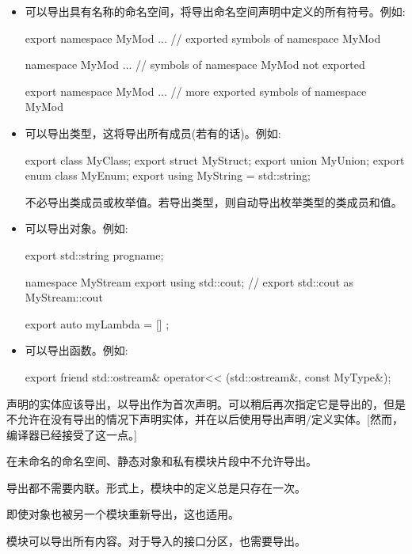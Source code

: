 \begin{itemize}
\item
可以导出具有名称的命名空间，将导出命名空间声明中定义的所有符号。例如:

\begin{cpp}
export namespace MyMod {
	... // exported symbols of namespace MyMod
}

namespace MyMod {
	... // symbols of namespace MyMod not exported
}

export namespace MyMod {
	... // more exported symbols of namespace MyMod
}
\end{cpp}

\item
可以导出类型，这将导出所有成员(若有的话)。例如:

\begin{cpp}
export class MyClass;
export struct MyStruct;
export union MyUnion;
export enum class MyEnum;
export using MyString = std::string;
\end{cpp}

不必导出类成员或枚举值。若导出类型，则自动导出枚举类型的类成员和值。

\item
可以导出对象。例如:

\begin{cpp}
export std::string progname;

namespace MyStream {
	export using std::cout; // export std::cout as MyStream::cout
}

export auto myLambda = [] {};
\end{cpp}

\item
可以导出函数。例如:

\begin{cpp}
export friend std::ostream& operator<< (std::ostream&, const MyType&);
\end{cpp}
\end{itemize}

声明的实体应该导出，以导出作为首次声明。可以稍后再次指定它是导出的，但是不允许在没有导出的情况下声明实体，并在以后使用导出声明/定义实体。[然而，编译器已经接受了这一点。]

在未命名的命名空间、静态对象和私有模块片段中不允许导出。

导出都不需要内联。形式上，模块中的定义总是只存在一次。

即使对象也被另一个模块重新导出，这也适用。


模块可以导出所有内容。对于导入的接口分区，也需要导出。

